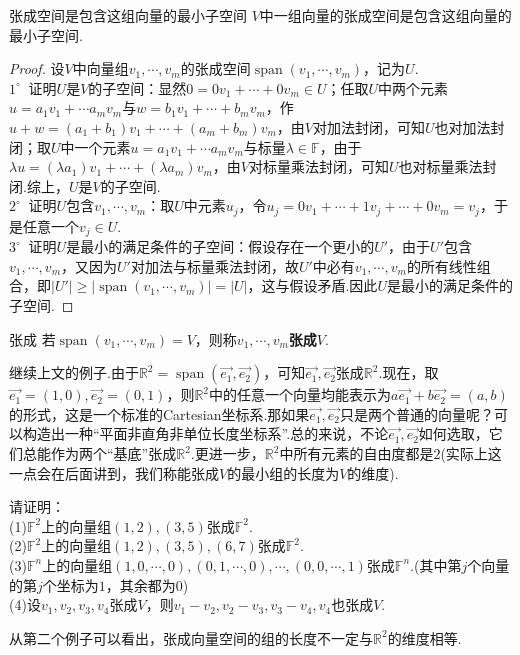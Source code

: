 \documentclass[lang=cn, zihao=5]{elegantbook}
\newcommand{\xl}[1]{\overrightarrow{#1}}
\newcommand{\R}{\mathbb{R}}
\newcommand{\F}{\mathbb{F}}
\newcommand{\buzhou}[1]{$#1^{\circ} \ $}
\DeclareMathOperator{\spn}{span}
\begin{document}
\begin{proposition}{张成空间是包含这组向量的最小子空间}
	$V$中一组向量的张成空间是包含这组向量的最小子空间.
\end{proposition}
\begin{proof}
	设$V$中向量组$v_1, \cdots ,v_m$的张成空间$\spn (v_1, \cdots ,v_m)$，记为$U$. \\
	\buzhou{1} 证明$U$是$V$的子空间：显然$0=0v_1 + \cdots + 0v_m \in U$；任取$U$中两个元素$u=a_1v_1 + \cdots a_mv_m$与$w=b_1v_1 + \cdots + b_mv_m$，作$u+w = (a_1+b_1)v_1 + \cdots + (a_m+b_m)v_m$，由$V$对加法封闭，可知$U$也对加法封闭；取$U$中一个元素$u=a_1v_1 + \cdots a_mv_m$与标量$\lambda \in \F$，由于$\lambda u = (\lambda a_1) v_1 + \cdots + (\lambda a_m)v_m$，由$V$对标量乘法封闭，可知$U$也对标量乘法封闭.综上，$U$是$V$的子空间.\\
    \buzhou{2} 证明$U$包含$v_1,\cdots ,v_m$：取$U$中元素$u_j$，令$u_j=0v_1 + \cdots + 1v_j + \cdots + 0v_m = v_j$，于是任意一个$v_j \in U$. \\
    \buzhou{3} 证明$U$是最小的满足条件的子空间：假设存在一个更小的$U'$，由于$U'$包含$v_1, \cdots ,v_m$，又因为$U'$对加法与标量乘法封闭，故$U'$中必有$v_1, \cdots ,v_m$的所有线性组合，即$|U'| \geq |\spn (v_1, \cdots ,v_m)| = |U|$，这与假设矛盾.因此$U$是最小的满足条件的子空间.
\end{proof}

\begin{definition}{张成}
	若$\spn (v_1, \cdots ,v_m) = V$，则称$v_1, \cdots ,v_m$\textbf{张成}$V$.
\end{definition}

继续上文的例子.由于$\R ^2 = \spn (\xl{e_1},\xl{e_2})$，可知$\xl{e_1},\xl{e_2}$张成$\R ^2$.现在，取$\xl{e_1} = (1,0),\xl{e_2} = (0,1)$，则$\R ^2$中的任意一个向量均能表示为$a\xl{e_1} + b\xl{e_2} = (a,b)$的形式，这是一个标准的Cartesian坐标系.那如果$\xl{e_1},\xl{e_2}$只是两个普通的向量呢？可以构造出一种“平面非直角非单位长度坐标系”.总的来说，不论$\xl{e_1},\xl{e_2}$如何选取，它们总能作为两个“基底”张成$\R ^2$.更进一步，$\R ^{2}$中所有元素的自由度都是$2$(实际上这一点会在后面讲到，我们称能张成$V$的最小组的长度为$V$的维度).

\begin{example}
	请证明： \\
	(1)$\F ^{2}$上的向量组$(1,2),(3,5)$张成$\F ^{2}$. \\
	(2)$\F ^{2}$上的向量组$(1,2),(3,5),(6,7)$张成$\F ^{2}$. \\
	(3)$\F ^{n}$上的向量组$(1,0,\cdots ,0),(0,1,\cdots ,0),\cdots , (0,0, \cdots ,1)$张成$\F ^{n}$.(其中第$j$个向量的第$j$个坐标为$1$，其余都为$0$) \\
	(4)设$v_1,v_2,v_3,v_4$张成$V$，则$v_1-v_2,v_2-v_3,v_3-v_4,v_4$也张成$V$.
\end{example}
\begin{remark}
	从第二个例子可以看出，张成向量空间的组的长度不一定与$\R ^2$的维度相等.
\end{remark}
\end{document}

